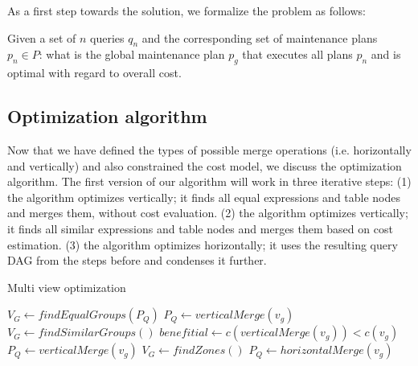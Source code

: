 As a first step towards the solution, we formalize the 
problem as follows: 

Given a set of $n$ queries $q_n$ and the corresponding
set of maintenance plans $p_n \in P$: what is the global maintenance
plan $p_g$ that executes all plans $p_n$ and is optimal with 
regard to overall cost.  




\subsection{Optimization algorithm}



Now that we have defined the types of possible merge operations (i.e. 
horizontally and vertically) and also constrained the cost model, we
discuss the optimization algorithm. The first version of our algorithm 
will work in three iterative steps: (1) the algorithm optimizes 
vertically; it finds all equal expressions and table nodes and merges 
them, without cost evaluation. (2) the algorithm optimizes vertically;
it finds all similar expressions and table nodes and merges them based
on cost estimation. (3) the algorithm optimizes horizontally; it uses
the resulting query DAG from the steps before and condenses it further.


\begin{algorithm}
\caption{Multi view optimization}
\label{alg:assignvm}
\begin{algorithmic}[5]
\State $V_G \leftarrow findEqualGroups(P_{Q})$
\State $P_{Q} \leftarrow verticalMerge(v_g)$	
\EndFor
\State $V_G \leftarrow findSimilarGroups()$	
\State $benefitial \leftarrow c(verticalMerge(v_g)) < c(v_g) $
\State $P_{Q} \leftarrow verticalMerge(v_g)$
\EndIf	
\EndFor
\State $V_G \leftarrow findZones()$
\State $P_{Q} \leftarrow horizontalMerge(v_g)$	
\EndFor
\EndProcedure
\end{algorithmic}
\end{algorithm}


